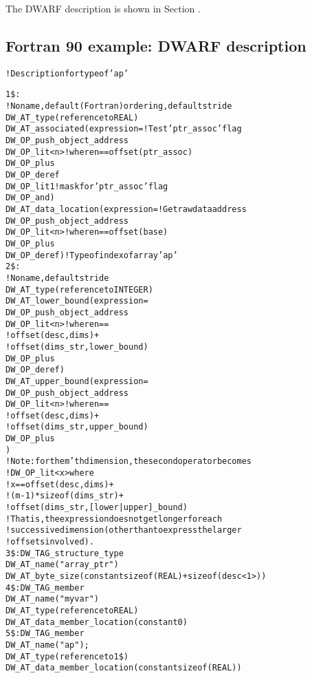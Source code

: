 The DWARF description is shown in 
Section .

\subsection{Fortran 90 example: DWARF description}
\label{app:fortran90exampledwarfdescription}

\begin{alltt}
! Description for type of 'ap'

1\$: 
        ! No name, default (Fortran) ordering, default stride
        DW\_AT\_type(reference to REAL)
        DW\_AT\_associated(expression= ! Test 'ptr\_assoc' flag
            DW\_OP\_push\_object\_address
            DW\_OP\_lit<n> ! where n == offset(ptr\_assoc)
            DW\_OP\_plus
            DW\_OP\_deref
            DW\_OP\_lit1 ! mask for 'ptr\_assoc' flag
            DW\_OP\_and)
        DW\_AT\_data\_location(expression= ! Get raw data address
            DW\_OP\_push\_object\_address
            DW\_OP\_lit<n> ! where n == offset(base)
            DW\_OP\_plus
            DW\_OP\_deref) ! Type of index of array 'ap'
2\$:     
        ! No name, default stride
        DW\_AT\_type(reference to INTEGER)
        DW\_AT\_lower\_bound(expression=
        DW\_OP\_push\_object\_address
            DW\_OP\_lit<n> ! where n ==
                         !  offset(desc, dims) +
                         !  offset(dims\_str, lower\_bound)
            DW\_OP\_plus
            DW\_OP\_deref)
        DW\_AT\_upper\_bound(expression=
            DW\_OP\_push\_object\_address
            DW\_OP\_lit<n> ! where n ==
                         !  offset(desc, dims) +
                         !  offset(dims\_str, upper\_bound)
            DW\_OP\_plus
            )
        !  Note: for the m'th dimension, the second operator becomes
        !  DW\_OP\_lit<x> where
        !  x == offset(desc, dims) +
        !  (m-1)*sizeof(dims\_str) +
        !  offset(dims\_str, [lower|upper]\_bound)
        !  That is, the expression does not get longer for each
        !  successive dimension (other than to express the larger
        !  offsets involved).
3\$: DW\_TAG\_structure\_type
        DW\_AT\_name("array\_ptr")
        DW\_AT\_byte\_size(constant sizeof(REAL) + sizeof(desc<1>))
4\$:     DW\_TAG\_member
            DW\_AT\_name("myvar")
            DW\_AT\_type(reference to REAL)
            DW\_AT\_data\_member\_location(constant 0)
5\$:     DW\_TAG\_member
            DW\_AT\_name("ap");
            DW\_AT\_type(reference to 1\$)
            DW\_AT\_data\_member\_location(constant sizeof(REAL))


\end{alltt}
